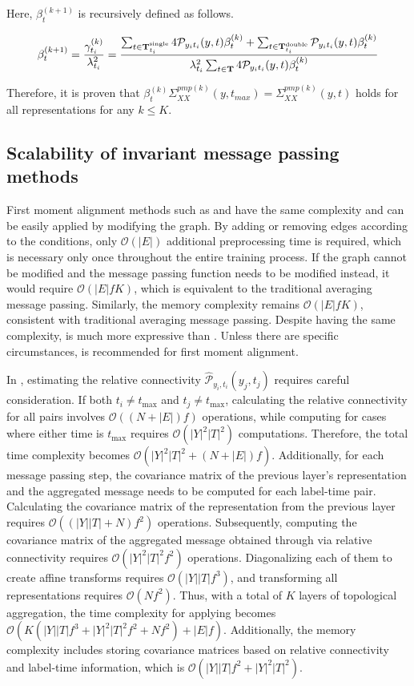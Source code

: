 Here, $\beta_t^{(k+1)}$ is recursively defined as follows.

\begin{align}
\beta_t^{(k+1)} = {\gamma_{t_i}^{(k)}\over\lambda_{t_i}^2}={\sum_{t\in\bold{T}_{t_i}^{\text{single}}}4\mathcal{P}_{y_i t_i}(y, t)\beta_t^{(k)}+\sum_{t\in\bold{T}_{t_i}^{\text{double}}}\mathcal{P}_{y_i t_i}(y, t)\beta_t^{(k)}\over \lambda_{t_i}^2\sum_{t\in\bold{T}}4\mathcal{P}_{y_i t_i}(y, t)\beta_t^{(k)}}
\end{align}

Therefore, it is proven that $\beta_{t}^{(k)}\Sigma_{XX}^{pmp (k)}(y,t_{max})= \Sigma_{XX}^{pmp (k)}(y,t)$ holds for all representations for any $k\le K$.



\subsection{Scalability of invariant message passing methods}
\label{apdx:scalability}
First moment alignment methods such as \MMP and \PMP have the same complexity and can be easily applied by modifying the graph. By adding or removing edges according to the conditions, only $\mathcal{O}(|E|)$ additional preprocessing time is required, which is necessary only once throughout the entire training process. If the graph cannot be modified and the message passing function needs to be modified instead, it would require $\mathcal{O}(|E|fK)$, which is equivalent to the traditional averaging message passing. Similarly, the memory complexity remains $\mathcal{O}(|E|fK)$, consistent with traditional averaging message passing. Despite having the same complexity, \PMP is much more expressive than \MMP. Unless there are specific circumstances, \PMP is recommended for first moment alignment.

In \PNY, estimating the relative connectivity $\hat{\mathcal{P}}_{y_i, t_i}(y_j, t_j)$ requires careful consideration. If both $t_i\neq t_{\text{max}}$ and $t_j\neq t_{\text{max}}$, calculating the relative connectivity for all pairs involves $\mathcal{O}((N+|E|)f)$ operations, while computing for cases where either time is $t_{\text{max}}$ requires $\mathcal{O}(|Y|^2|T|^2)$ computations. Therefore, the total time complexity becomes $\mathcal{O}(|Y|^2|T|^2+(N+|E|)f)$. Additionally, for each message passing step, the covariance matrix of the previous layer's representation and the aggregated message needs to be computed for each label-time pair. Calculating the covariance matrix of the representation from the previous layer requires $\mathcal{O}((|Y||T|+N)f^2)$ operations. Subsequently, computing the covariance matrix of the aggregated message obtained through \PMP via relative connectivity requires $\mathcal{O}(|Y|^2|T|^2f^2)$ operations. Diagonalizing each of them to create affine transforms requires $\mathcal{O}(|Y||T|f^3)$, and transforming all representations requires $\mathcal{O}(Nf^2)$. Thus, with a total of $K$ layers of topological aggregation, the time complexity for applying \PNY becomes $\mathcal{O}(K(|Y||T|f^3+|Y|^2|T|^2f^2+Nf^2)+|E|f)$. Additionally, the memory complexity includes storing covariance matrices based on relative connectivity and label-time information, which is $\mathcal{O}(|Y||T|f^2 + |Y|^2|T|^2)$.

